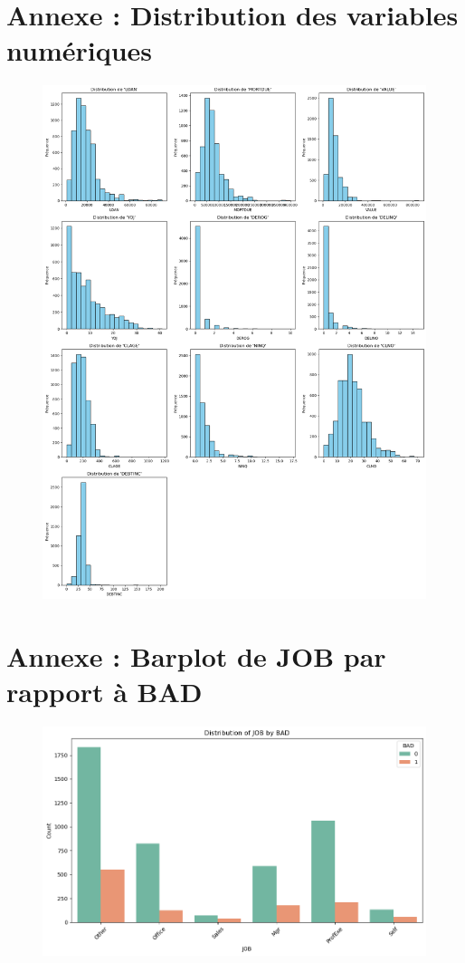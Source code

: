 \documentclass[a4paper,12pt]{report}
\begin{document}
\pagebreak
\appendix
\section{Annexe : Distribution des variables numériques}

\begin{figure}[h!]
  \centering
  \includegraphics[width=\textwidth]{../images/plot_dist_num_data}
  \label{fig:plot_dist_num_data}
\end{figure}

\section{Annexe : Barplot de JOB par rapport à BAD}
\begin{figure}[h!]
  \includegraphics[width=\textwidth]{../images/barplot_job_by_bad}
  \label{fig:barplot_job_by_bad}
\end{figure}
\end{document}
